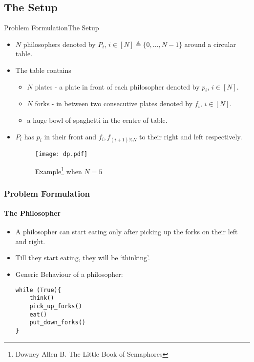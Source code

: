 \documentclass[aspectratio=169, handout, 10pt]{beamer}
\theoremstyle{example}
\begin{document}
\subsection{The Setup}
\begin{frame}{Problem Formulation}{The Setup}
  \begin{itemize}
  \pause\item $N$ philosophers denoted by $P_i$, $i \in [N]\triangleq \{0, . . . , N-1\}$ around a circular table.%
  \pause\item The table contains
\begin{itemize}
    \pause\item $N$ plates - a plate in front of each philosopher denoted by $p_i$, $i \in [N]$.
    \pause\item $N$ forks - in between two consecutive plates denoted by $f_i$, $i \in [N]$. %
    \pause\item a huge bowl of spaghetti in the centre of table.
\end{itemize}
\pause\item $P_i$ has $p_i$ in their front and $f_i, f_{(i+1)\%N}$ to their right and left respectively.
\begin{figure}
    \centering
    \texttt{[image: dp.pdf]}
    \caption{Example\footnote{\tiny Downey Allen B. The Little Book of Semaphores} when $N=5$}
    \label{fig:dp}
\end{figure}
  \end{itemize}
\end{frame}
\begin{frame}[fragile]\frametitle{Problem Formulation}\framesubtitle{The Philosopher}
  \begin{itemize}
  \pause\item A philosopher can start eating only after picking up the forks on their left and right.
  \pause\item Till they start eating, they will be `thinking'.
  \pause\item Generic Behaviour of a philosopher:
  \begin{Verbatim}[frame=single]
while (True){
    think()
    pick_up_forks()
    eat()
    put_down_forks()
}
\end{Verbatim}
  \end{itemize}
\end{frame}
\end{document}
